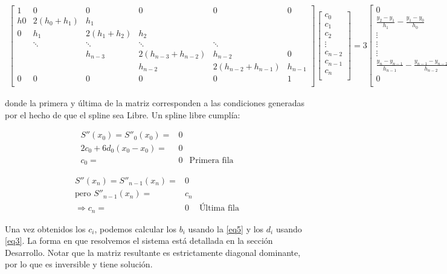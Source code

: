 $\begin{array}{l} \begin{bmatrix} 
1 & 0 & 0 & 0 & 0 & 0 \\
h0 & 2(h_0+h_1) & h_1 & \text{} & \text{} & \text{} \\ 
0 & h_1 & 2(h_1+h_2) & h_2 & \text{} & \text{} \\ 
\text{} & \ddots & \ddots & \ddots & \ddots & \text{} \\ 
\text{} & \text{} & h_{n-3} & 2(h_{n-3}+h_{n-2}) & h_{n-2} & 0 \\
\text{} & \text{} & \text{} & h_{n-2} & 2(h_{n-2}+h_{n-1}) & h_{n-1} \\
0 & 0 & 0 & 0 & 0 & 1 \\
\end{bmatrix} 
\begin{bmatrix} c_0 \\ c_1 \\ c_2 \\ \vdots \\ c_{n-2} \\ c_{n-1} \\ c_n \\ \end{bmatrix} 
= 3 \begin{bmatrix} 0 \\ \frac{y_{2}-y_{1}}{h_{1}}  -\frac{y_1-y_{0}}{h_{0}} \\ \vdots \\ \vdots \\ \vdots \\ \frac{y_{n}-y_{n-1}}{h_{n-1}}  -\frac{y_{n-1}-y_{n-2}}{h_{n-2}} \\ 0 \\ \end{bmatrix} \end{array}$

\par donde la primera y última de la matriz corresponden a las condiciones generadas por el hecho de que el spline sea Libre. Un spline libre cumplía: 

\begin{align*}
S''(x_0) = S''_0(x_0) = & 0 \\
2c_0 + 6d_0(x_0 - x_0) = & 0 \\
c_0 = & 0 & \text{Primera fila}
\end{align*}

\begin{align*}
S''(x_n) = S''_{n-1}(x_n) = & 0 \\
\text{pero } S''_{n-1}(x_n) = & c_n \\
\Rightarrow c_n = & 0 & \text{Última fila}
\end{align*}


\par Una vez obtenidos los $c_i$, podemos calcular los $b_i$ usando la \eqref{eq5} y los $d_i$ usando \eqref{eq3}. La forma en que resolvemos el sistema está detallada en la sección Desarrollo. Notar que la matriz resultante es estrictamente diagonal dominante, por lo que es inversible y tiene solución.



